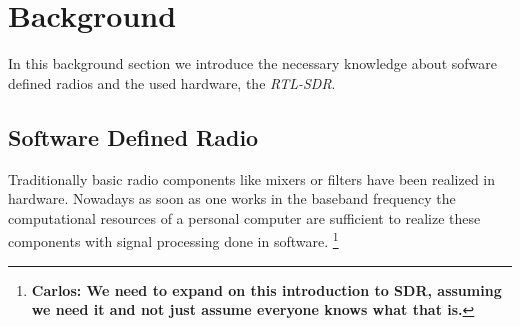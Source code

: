 \documentclass[conference]{IEEEtran}
\newcommand{\cp}[1]{\footnote{{\bf Carlos: #1}}}
\begin{document}
%



\section{Background}

In this background section we introduce the necessary knowledge about sofware defined radios and the used hardware, the \textit{RTL-SDR}.  

\subsection{Software Defined Radio}
Traditionally basic radio components like mixers or filters have been realized
in hardware. Nowadays as soon as one works in the baseband frequency the
computational resources of a personal computer are sufficient to realize these
components with signal processing done in software. \cp{We need to expand on
this introduction to SDR, assuming we need it and not just assume everyone
knows what that is.}
\end{document}
